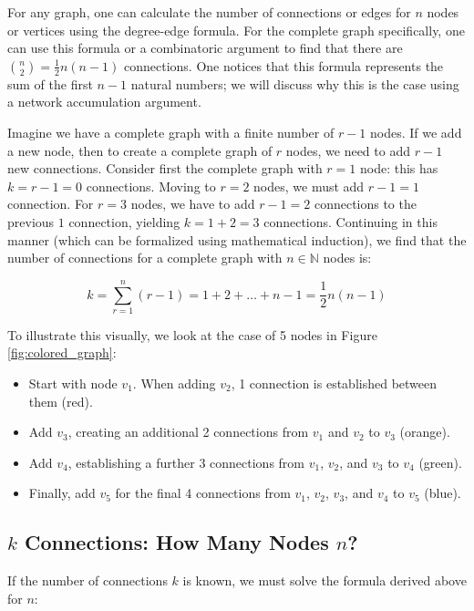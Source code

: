 \documentclass[
  12pt,
  letterpaper,
]{article}
\providecommand{\tightlist}{%
  \setlength{\itemsep}{0pt}\setlength{\parskip}{0pt}}
\newcommand{\N}{\mathbb{N}}
\theoremstyle{plain}
\theoremstyle{definition}
\begin{document}
For any graph, one can calculate the number of connections or edges for
\(n\) nodes or vertices using the degree-edge formula. For the complete
graph specifically, one can use this formula or a combinatoric argument
to find that there are \({n \choose 2} = \frac{1}{2}n(n-1)\)
connections. One notices that this formula represents the sum of the
first \(n-1\) natural numbers; we will discuss why this is the case
using a network accumulation argument.

Imagine we have a complete graph with a finite number of \(r-1\) nodes.
If we add a new node, then to create a complete graph of \(r\) nodes, we
need to add \(r-1\) new connections. Consider first the complete graph
with \(r=1\) node: this has \(k = r-1 = 0\) connections. Moving to
\(r=2\) nodes, we must add \(r-1=1\) connection. For \(r=3\) nodes, we
have to add \(r-1=2\) connections to the previous \(1\) connection,
yielding \(k=1+2=3\) connections. Continuing in this manner (which can
be formalized using mathematical induction), we find that the number of
connections for a complete graph with \(n \in \N\) nodes is:

\[k = \sum_{r=1}^{n}(r-1)=1+2+\dots+n-1 = \frac{1}{2}n(n-1)\]

To illustrate this visually, we look at the case of 5 nodes in Figure
\ref{fig:colored_graph}:

\begin{itemize}
\tightlist
\item
  Start with node \(v_1\). When adding \(v_2\), 1 connection is
  established between them (red).
\item
  Add \(v_3\), creating an additional 2 connections from \(v_1\) and
  \(v_2\) to \(v_3\) (orange).
\item
  Add \(v_4\), establishing a further 3 connections from \(v_1\),
  \(v_2\), and \(v_3\) to \(v_4\) (green).
\item
  Finally, add \(v_5\) for the final 4 connections from \(v_1\),
  \(v_2\), \(v_3\), and \(v_4\) to \(v_5\) (blue).
\end{itemize}

\subsection{\texorpdfstring{\(k\) Connections: How Many Nodes
\(n\)?}{k Connections: How Many Nodes n?}}\label{k-connections-how-many-nodes-n}

If the number of connections \(k\) is known, we must solve the formula
derived above for \(n\):
\end{document}
